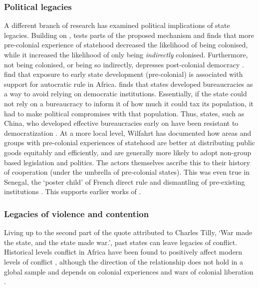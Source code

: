 \subsubsection{Political legacies} \label{Political legacies}

A different branch of research has examined political implications of state
legacies. Building on \citet{Acemoglu_2002}, \citet{Hariri2012} tests parts of
the proposed mechanism and finds that more pre-colonial experience of statehood
decreased the likelihood of being colonised, while it increased the likelihood
of only being \textit{indirectly} colonised. Furthermore, not being colonised,
or being so indirectly, depresses post-colonial democracy \citep{Hariri2012}.
\citet{Chlouba_2021} find that exposure to early state development
(pre-colonial) is associated with support for autocratic rule in Africa.
\citet{StasavageDavid2020Tdar} finds that states developed bureaucracies as a
way to avoid relying on democratic institutions. Essentially, if the state could
not rely on a bureaucracy to inform it of how much it could tax its population,
it had to make political compromises with that population. Thus, states, such as
China, who developed effective bureaucracies early on have been resistant to
democratization \citep{StasavageDavid2020Tdar}. At a more local level, Wilfahrt
\citeyear{Wilfahrt2018, Wilfahrt_2021} has documented how areas and groups with
pre-colonial experiences of statehood are better at distributing public goods
equitably and efficiently, and are generally more likely to adopt non-group
based legislation and politics. The actors themselves ascribe this to their
history of cooperation (under the umbrella of pre-colonial states). This was even
true in Senegal, the `poster child' of French direct rule and dismantling of
pre-existing institutions \citep{Wilfahrt_2021}. This supports earlier works of
\citet{Gennaioli_2007, Gennaioli2007a}.

\subsubsection{Legacies of violence and contention} 
\label{Legacies of violence and contention}

Living up to the second part of the quote attributed to Charles Tilly, `War
made the state, and the state made war.', past states can leave legacies of
conflict. Historical levels conflict in Africa have been found to positively
affect modern levels of conflict \citep{Besley2014}, although the direction of
the relationship does not hold in a global sample and depends on colonial
experiences and wars of colonial liberation \citep{Fearon2014}. 

